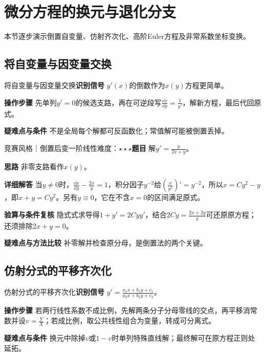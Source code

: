 \section{微分方程的换元与退化分支}\label{ic:delta_ode}

\begin{examtip}本节逐步演示倒置自变量、仿射齐次化、高阶Euler方程及非常系数坐标变换。\end{examtip}

\subsection{将自变量与因变量交换}\label{ic:delta_ode:invert}\begin{method}{将自变量与因变量交换}\textbf{识别信号} $y'(x)$的倒数作为$x(y)$方程更简单。\par \textbf{操作步骤} 先单列$y'=0$的候选支路，再在可逆段写$\frac{\dd x}{\dd y}=\frac{1}{y'}$，解新方程，最后代回原式。\par \textbf{疑难点与条件} 不是全局每个解都可反函数化；常值解可能被倒置丢掉。\end{method}

\begin{example}{竞赛风格｜倒置后变一阶线性}{难度：$\star\star\star$}\label{ic:ex:delta_ode:invertcase}\textbf{题目} 解$y'=\frac{y}{2x+y}$。\par \textbf{思路} 非零支路看作$x(y)$。\par \textbf{详细解答} 当$y\ne0$时，$\frac{\dd x}{\dd y}-\frac{2x}{y}=1$，积分因子$y^{-2}$给$(\frac{x}{y^2})'=y^{-2}$，所以$x=Cy^2-y$，即$x+y=Cy^2$。另有$y\equiv0$，它在不含$x=0$的区间满足原式。\par \textbf{验算与条件复核} 隐式式求导得$1+y'=2Cyy'$，结合$2Cy=\frac{2x+2y}{y}$可还原原方程；还须排除$2x+y=0$。\par \textbf{疑难点与方法比较} 补零解并检查原分母，是倒置法的两个关键。\end{example}

\subsection{仿射分式的平移齐次化}\label{ic:delta_ode:affine}\begin{method}{仿射分式的平移齐次化}\textbf{识别信号} $y'=\frac{a_1x+b_1y+c_1}{a_2x+b_2y+c_2}$。\par \textbf{操作步骤} 若两行线性系数不成比例，先解两条分子分母零线的交点，再平移消常数并设$v=\frac{Y}{X}$；若成比例，取公共线性组合为变量，转成可分离式。\par \textbf{疑难点与条件} 换元中除掉$v$或$1-v$时单列特殊直线解；最终解可在原方程正则处延拓。\end{method}


